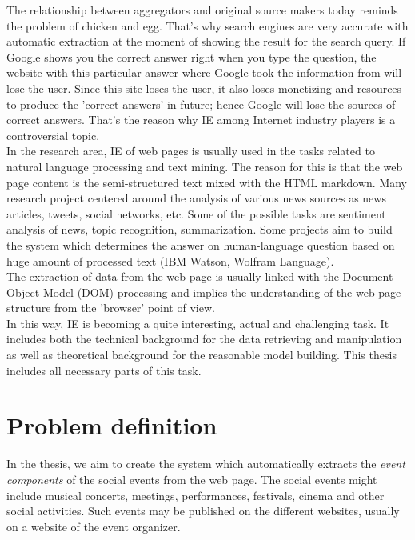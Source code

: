 The relationship between aggregators and original source makers today reminds the problem of chicken and egg. That's why search engines are very accurate with automatic extraction at the moment of showing the result for the search query. If Google shows you the correct answer right when you type the question, the website with this particular answer where Google took the information from will lose the user. Since this site loses the user, it also loses monetizing and resources to produce the 'correct answers' in future; hence Google will lose the sources of correct answers. That's the reason why IE among Internet industry players is a controversial topic.\\

In the research area, IE of web pages is usually used in the tasks related to natural language processing and text mining. The reason for this is that the web page content is the semi-structured text mixed with the HTML markdown. Many research project centered around the analysis of various news sources as news articles, tweets, social networks, etc. Some of the possible tasks are sentiment analysis of news, topic recognition, summarization. Some projects aim to build the system which determines the answer on human-language question based on huge amount of processed text (IBM Watson, Wolfram Language).\\      

The extraction of data from the web page is usually linked with the Document Object Model (DOM) processing and implies the understanding of the web page structure from the 'browser' point of view. \\

In this way, IE is becoming a quite interesting, actual and challenging task. It includes both the technical background for the data retrieving and manipulation as well as theoretical background for the reasonable model building. This thesis includes all necessary parts of this task.

\section{Problem definition}
In the thesis, we aim to create the system which automatically extracts the \textit{event components} of the social events from the web page. The social events might include musical concerts, meetings, performances, festivals, cinema and other social activities. Such events may be published on the different websites, usually on a website of the event organizer.\\

